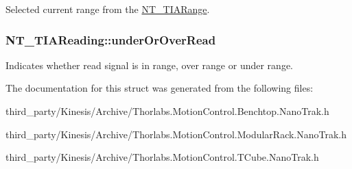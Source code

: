 Selected current range from the \hyperlink{group___common_ga2d700cb6733eb95975d787fb1915a74b}{N\+T\+\_\+\+T\+I\+A\+Range}. 

\subsubsection[{\texorpdfstring{under\+Or\+Over\+Read}{underOrOverRead}}]{ N\+T\+\_\+\+T\+I\+A\+Reading\+::under\+Or\+Over\+Read}\hypertarget{struct_n_t___t_i_a_reading_a1948194bb6ed2ee743f7920f2ed5c448}{}\label{struct_n_t___t_i_a_reading_a1948194bb6ed2ee743f7920f2ed5c448}


Indicates whether read signal is in range, over range or under range. 



The documentation for this struct was generated from the following files\+:\begin{DoxyCompactItemize}
\item 
third\+\_\+party/\+Kinesis/\+Archive/Thorlabs.\+Motion\+Control.\+Benchtop.\+Nano\+Trak.\+h\item 
third\+\_\+party/\+Kinesis/\+Archive/Thorlabs.\+Motion\+Control.\+Modular\+Rack.\+Nano\+Trak.\+h\item 
third\+\_\+party/\+Kinesis/\+Archive/Thorlabs.\+Motion\+Control.\+T\+Cube.\+Nano\+Trak.\+h\end{DoxyCompactItemize}
